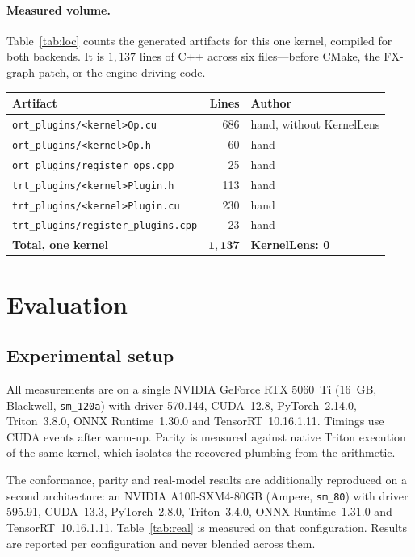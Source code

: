\documentclass[10pt]{article}
\begin{document}
\paragraph{Measured volume.} Table~\ref{tab:loc} counts the generated artifacts
for this one kernel, compiled for both backends. It is $1{,}137$ lines of
C++ across six files---before CMake, the FX-graph patch, or the engine-driving
code.

\begin{center}
\small
\begin{tabular}{l r l}
\toprule
\textbf{Artifact} & \textbf{Lines} & \textbf{Author} \\ \midrule
\texttt{ort\_plugins/<kernel>Op.cu} & 686 & hand, without KernelLens \\
\texttt{ort\_plugins/<kernel>Op.h} & 60 & hand \\
\texttt{ort\_plugins/register\_ops.cpp} & 25 & hand \\
\texttt{trt\_plugins/<kernel>Plugin.h} & 113 & hand \\
\texttt{trt\_plugins/<kernel>Plugin.cu} & 230 & hand \\
\texttt{trt\_plugins/register\_plugins.cpp} & 23 & hand \\ \midrule
\textbf{Total, one kernel} & $\mathbf{1{,}137}$ & \textbf{KernelLens: 0} \\
\bottomrule
\end{tabular}
\label{tab:loc}
\end{center}

\section{Evaluation}
\label{sec:eval}

\subsection{Experimental setup}

All measurements are on a single NVIDIA GeForce RTX 5060~Ti (16~GB, Blackwell,
\texttt{sm\_120a}) with driver 570.144, CUDA~12.8, PyTorch~2.14.0, Triton~3.8.0,
ONNX Runtime~1.30.0 and TensorRT~10.16.1.11. Timings use CUDA events after
warm-up. Parity is measured against native Triton execution of the same kernel,
which isolates the recovered plumbing from the arithmetic.

The conformance, parity and real-model results are additionally reproduced on a
second architecture: an NVIDIA A100-SXM4-80GB (Ampere, \texttt{sm\_80}) with
driver 595.91, CUDA~13.3, PyTorch~2.8.0, Triton~3.4.0, ONNX
Runtime~1.31.0 and TensorRT~10.16.1.11. Table~\ref{tab:real} is measured on
that configuration. Results are reported per configuration and never blended
across them.
\end{document}
